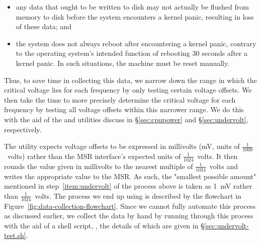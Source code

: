 \begin{itemize}
    \item any data that ought to be written to disk may not actually be flushed
        from memory to disk before the system encounters a kernel panic,
        resulting in loss of these data; and
    \item the system does not always reboot after encountering a kernel panic,
        contrary to the operating system's intended function of rebooting 30
        seconds after a kernel panic. In such situations, the machine must be
        reset manually.
\end{itemize}

Thus, to save time in collecting this data, we narrow down the range in which
the critical voltage lies for each frequency by only testing certain voltage
offsets. We then take the time to more precisely determine the critical voltage
for each frequency by testing all voltage offsets within this narrower range.
We do this with the aid of the  and  utilities
discuss in §\ref{sec:cpupower} and §\ref{sec:undervolt}, respectively.

The  utility expects voltage offsets to be expressed in
millivolts (mV, units of $\frac{1}{1000}$~volts) rather than the MSR interface's
expected units of $\frac{1}{1024}$~volts. It then rounds the value given in
millivolts to the nearest multiple of $\frac{1}{1024}$~volts and writes the
appropriate value to the MSR. As such, the "smallest possible amount" mentioned
in step~\ref{item:undervolt} of the process above is taken as 1~mV rather than
$\frac{1}{1024}$~volts. The process we end up using is described by the
flowchart in Figure~\ref{fig:data-collection-flowchart}. Since we cannot fully
automate this process as discussed earlier, we collect the data by hand by
running through this process with the aid of a shell script,
, the details of which are given in
§\ref{sec:undervolt-test.sh}.

